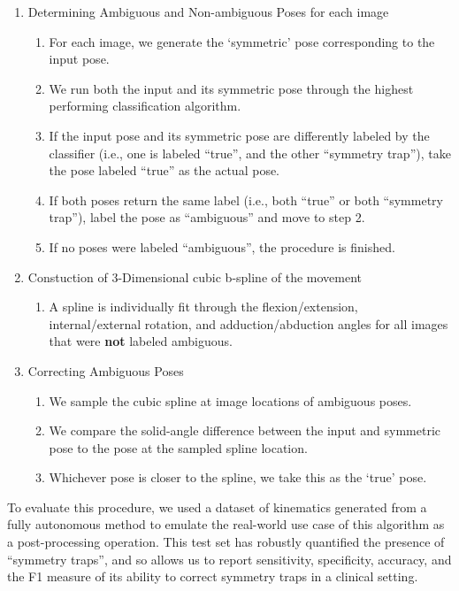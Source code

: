 {\begin{enumerate}
	\item Determining Ambiguous and Non-ambiguous Poses for each image
	      \begin{enumerate}
		      \item For each image, we generate the `symmetric' pose corresponding to the input pose.
		      \item We run both the input and its symmetric pose through the highest performing classification algorithm.
		      \item If the input pose and its symmetric pose are differently labeled by the classifier (i.e., one is labeled ``true'', and the other ``symmetry trap''), take the pose labeled ``true'' as the actual pose.
		      \item If both poses return the same label (i.e., both ``true'' or both ``symmetry trap''), label the pose as “ambiguous” and move to step 2.
		      \item If no poses were labeled “ambiguous”, the procedure is finished.
	      \end{enumerate}
	\item Constuction of 3-Dimensional cubic b-spline of the movement
	      \begin{enumerate}
		      \item A spline is individually fit through the flexion/extension, internal/external rotation, and adduction/abduction angles for all images that were {\bf not} labeled ambiguous.
	      \end{enumerate}
	\item Correcting Ambiguous Poses
	      \begin{enumerate}
		      \item We sample the cubic spline at image locations of ambiguous poses.
		      \item We compare the solid-angle difference between the input and symmetric pose to the pose at the sampled spline location.
		      \item Whichever pose is closer to the spline, we take this as the `true' pose.
	      \end{enumerate}
\end{enumerate}

To evaluate this procedure, we used a dataset of kinematics generated from a fully autonomous method \cite{jensenJointTrackMachine2023} to emulate the real-world use case of this algorithm as a post-processing operation.
This test set has robustly quantified the presence of “symmetry traps”, and so allows us to report sensitivity, specificity, accuracy, and the F1 measure of its ability to correct symmetry traps in a clinical setting.


}

